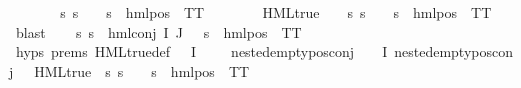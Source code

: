 \begin{isabellebody}
\ \ \isamarkupfalse%
\ \isamarkupfalse%
\ {\isasymalpha}\ \ {\isachardoublequoteopen}{\isasymforall}s{\isachardot}{\kern0pt}\ {\isacharparenleft}{\kern0pt}s\ {\isasymTurnstile}\ {\isasymphi}{\isacharparenright}{\kern0pt}\ {\isacharequal}{\kern0pt}\ {\isacharparenleft}{\kern0pt}s\ {\isasymTurnstile}\ hml{\isacharunderscore}{\kern0pt}pos\ {\isasymalpha}\ TT{\isacharparenright}{\kern0pt}{\isachardoublequoteclose}\ \isanewline
\ \ \ \ \isamarkupfalse%
\ {\isacartoucheopen}{\isasymnot}\ HML{\isacharunderscore}{\kern0pt}true\ {\isasymphi}\ {\isasymlongrightarrow}\ {\isacharparenleft}{\kern0pt}{\isasymexists}{\isasymalpha}{\isachardot}{\kern0pt}\ {\isasymforall}s{\isachardot}{\kern0pt}\ {\isacharparenleft}{\kern0pt}s\ {\isasymTurnstile}\ {\isasymphi}{\isacharparenright}{\kern0pt}\ {\isacharequal}{\kern0pt}\ {\isacharparenleft}{\kern0pt}s\ {\isasymTurnstile}\ hml{\isacharunderscore}{\kern0pt}pos\ {\isasymalpha}\ TT{\isacharparenright}{\kern0pt}{\isacharparenright}{\kern0pt}{\isacartoucheclose}\ \isamarkupfalse%
\ blast\isanewline
\ \ \isamarkupfalse%
\ {\isachardoublequoteopen}{\isasymforall}s{\isachardot}{\kern0pt}\ {\isacharparenleft}{\kern0pt}s\ {\isasymTurnstile}\ hml{\isacharunderscore}{\kern0pt}conj\ I\ J\ {\isasymPhi}{\isacharparenright}{\kern0pt}\ {\isacharequal}{\kern0pt}\ {\isacharparenleft}{\kern0pt}s\ {\isasymTurnstile}\ hml{\isacharunderscore}{\kern0pt}pos\ {\isasymalpha}\ TT{\isacharparenright}{\kern0pt}{\isachardoublequoteclose}\ \isanewline
\ \ \ \ \isamarkupfalse%
\ {\isachardoublequoteopen}{}{\isachardot}{\kern0pt}hyps{\isachardoublequoteclose}\ {\isachardoublequoteopen}{}{\isachardot}{\kern0pt}prems{\isachardoublequoteclose}\ HML{\isacharunderscore}{\kern0pt}true{\isacharunderscore}{\kern0pt}def\ {\isacartoucheopen}{\isasymforall}{\isasympsi}{\isasymin}{\isasymPhi}\ {\isacharbackquote}{\kern0pt}\ I{\isachardot}{\kern0pt}\ {\isasympsi}\ {\isasymnoteq}\ {\isasymphi}\ {\isasymlongrightarrow}\ nested{\isacharunderscore}{\kern0pt}empty{\isacharunderscore}{\kern0pt}pos{\isacharunderscore}{\kern0pt}conj\ {\isasympsi}{\isacartoucheclose}\ {\isacartoucheopen}{\isasymforall}{\isasympsi}{\isasymin}{\isasymPhi}\ {\isacharbackquote}{\kern0pt}\ I{\isachardot}{\kern0pt}\ nested{\isacharunderscore}{\kern0pt}empty{\isacharunderscore}{\kern0pt}pos{\isacharunderscore}{\kern0pt}conj\ {\isasympsi}\ {\isasymlongrightarrow}\ HML{\isacharunderscore}{\kern0pt}true\ {\isasympsi}{\isacartoucheclose}\ {\isacartoucheopen}{\isasymforall}s{\isachardot}{\kern0pt}\ {\isacharparenleft}{\kern0pt}s\ {\isasymTurnstile}\ {\isasymphi}{\isacharparenright}{\kern0pt}\ {\isacharequal}{\kern0pt}\ {\isacharparenleft}{\kern0pt}s\ {\isasymTurnstile}\ hml{\isacharunderscore}{\kern0pt}pos\ {\isasymalpha}\ TT{\isacharparenright}{\kern0pt}{\isacartoucheclose}\ \isamarkupfalse%

\end{isabellebody}
